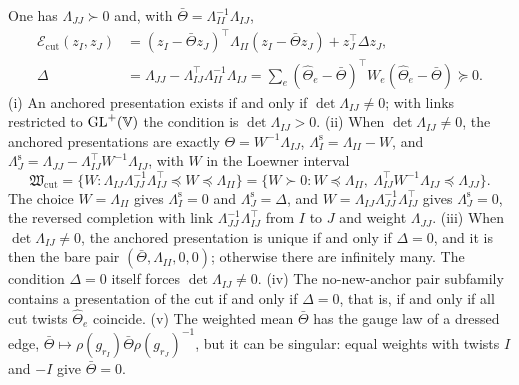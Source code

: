 One has $\Lambda_{JJ}\succ0$ and, with $\bar\Theta=\Lambda_{II}^{-1}\Lambda_{IJ}$,
\begin{align}
\mathcal E_{\mathrm{cut}}(z_I,z_J)&=(z_I-\bar\Theta z_J)^\top\Lambda_{II}(z_I-\bar\Theta z_J)+z_J^\top\Delta z_J,
\label{eq:cg-cut-completed-square}\\
\Delta&=\Lambda_{JJ}-\Lambda_{IJ}^\top\Lambda_{II}^{-1}\Lambda_{IJ}
=\sum_e(\widehat\Theta_e-\bar\Theta)^\top W_e(\widehat\Theta_e-\bar\Theta)\succeq0.
\label{eq:cg-cut-excess}
\end{align}
(i) An anchored presentation exists if and only if $\det\Lambda_{IJ}\neq0$; with links restricted to
$\mathrm{GL}^+(\mathbb V)$ the condition is $\det\Lambda_{IJ}>0$. (ii) When $\det\Lambda_{IJ}\neq0$, the anchored presentations are exactly
$\Theta=W^{-1}\Lambda_{IJ}$, $\Lambda^{\mathrm s}_I=\Lambda_{II}-W$, and
$\Lambda^{\mathrm s}_J=\Lambda_{JJ}-\Lambda_{IJ}^\top W^{-1}\Lambda_{IJ}$, with $W$ in the Loewner interval
\begin{equation}
\mathfrak W_{\mathrm{cut}}=\{W:\Lambda_{IJ}\Lambda_{JJ}^{-1}\Lambda_{IJ}^\top\preceq W\preceq\Lambda_{II}\}
=\{W\succ0:W\preceq\Lambda_{II},\ \Lambda_{IJ}^\top W^{-1}\Lambda_{IJ}\preceq\Lambda_{JJ}\}.
\label{eq:cg-cut-admissible-weights}
\end{equation}
The choice $W=\Lambda_{II}$ gives $\Lambda^{\mathrm s}_I=0$ and $\Lambda^{\mathrm s}_J=\Delta$, and
$W=\Lambda_{IJ}\Lambda_{JJ}^{-1}\Lambda_{IJ}^\top$ gives $\Lambda^{\mathrm s}_J=0$, the reversed completion with
link $\Lambda_{JJ}^{-1}\Lambda_{IJ}^\top$ from $I$ to $J$ and weight $\Lambda_{JJ}$. (iii) When
$\det\Lambda_{IJ}\neq0$, the anchored presentation is unique if and only if $\Delta=0$, and it is then the
bare pair $(\bar\Theta,\Lambda_{II},0,0)$; otherwise there are infinitely many. The condition $\Delta=0$
itself forces $\det\Lambda_{IJ}\neq0$. (iv) The no-new-anchor pair subfamily contains a presentation of the
cut if and only if $\Delta=0$, that is, if and only if all cut twists $\widehat\Theta_e$ coincide. (v) The
weighted mean $\bar\Theta$ has the gauge law of a dressed edge,
$\bar\Theta\mapsto\rho(g_{r_I})\bar\Theta\rho(g_{r_J})^{-1}$, but it can be singular: equal weights with
twists $I$ and $-I$ give $\bar\Theta=0$. 

